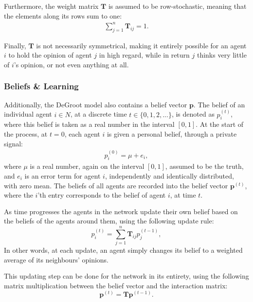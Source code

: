 \documentclass[a4paper, 12pt]{report}
\newcommand{\T}{\bm{T}}
\newcommand{\Tij}{\T_{ij}}
\newcommand{\beli}[3][2]{p_{#2}^{(#3)}}
\begin{document}
\newpage

\noindent Furthermore, the weight matrix $\T$ is assumed to be row-stochastic, meaning that the elements along its rows sum to one:
\begin{align*}
    \sum_{j=1}^{n} \Tij = 1.
\end{align*}

\noindent Finally, $\T$ is not necessarily symmetrical, making it entirely possible for an agent $i$ to hold the opinion of agent $j$ in high regard, while in return $j$ thinks very little of $i$'s opinion, or not even anything  at all.

\subsubsection{Beliefs \& Learning}
\label{beliefs}

Additionally, the DeGroot model also contains a belief vector $\bm{p}$. The belief of an individual agent $i \in N$, at a discrete time $t \in \{0, 1, 2, ...\}$, is denoted as $p_{i}^{(t)}$, where this belief is taken as a real number in the interval $[0, 1]$. At the start of the process, at $t=0$, each agent $i$ is given a personal belief, through a private signal:
\begin{align*}
    \beli{i}{0} = \mu + e_i,
\end{align*}
where $\mu$ is a real number, again on the interval $[0, 1]$, assumed to be the truth, and $e_i$ is an error term for agent $i$, independently and identically distributed, with zero mean.
The beliefs of all agents are recorded into the belief vector $\bm{p}^{(t)}$, where the $i$'th entry corresponds to the belief of agent $i$, at time $t$.

\noindent As time progresses the agents in the network update their own belief based on the beliefs of the agents around them, using the following update rule:
\begin{equation*}
    \beli{i}{t} = \sum_{j=1}^{n}\Tij\beli{j}{t-1},
\end{equation*}
In other words, at each update, an agent simply changes its belief to a weighted average of its neighbours' opinions. 

\noindent This updating step can be done for the network in its entirety, using the following matrix multiplication between the belief vector and the interaction matrix:
\begin{equation}
    \label{updating:standard}
    \bm{p}^{(t)} = \T\bm{p}^{(t-1)}.
\end{equation}
\end{document}
